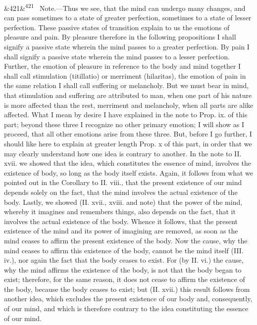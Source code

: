 \documentclass[12pt]{article}
\newcommand{\para}[1][]{\par\noindent\ifx&#1&\else\textsuperscript{\footnotesize #1}~\fi}
\begin{document}
\para[421] Note.---Thus we see, that the mind can undergo many changes, and can pass sometimes to a state of greater perfection, sometimes to a state of lesser perfection. These passive states of transition explain to us the emotions of pleasure and pain. By pleasure therefore in the following propositions I shall signify a passive state wherein the mind passes to a greater perfection. By pain I shall signify a passive state wherein the mind passes to a lesser perfection. Further, the emotion of pleasure in reference to the body and mind together I shall call stimulation (titillatio) or merriment (hilaritas), the emotion of pain in the same relation I shall call suffering or melancholy. But we must bear in mind, that stimulation and suffering are attributed to man, when one part of his nature is more affected than the rest, merriment and melancholy, when all parts are alike affected. What I mean by desire I have explained in the note to Prop. ix. of this part; beyond these three I recognize no other primary emotion; I will show as I proceed, that all other emotions arise from these three. But, before I go further, I should like here to explain at greater length Prop. x of this part, in order that we may clearly understand how one idea is contrary to another. In the note to II. xvii. we showed that the idea, which constitutes the essence of mind, involves the existence of body, so long as the body itself exists. Again, it follows from what we pointed out in the Corollary to II. viii., that the present existence of our mind depends solely on the fact, that the mind involves the actual existence of the body. Lastly, we showed (II. xvii., xviii. and note) that the power of the mind, whereby it imagines and remembers things, also depends on the fact, that it involves the actual existence of the body. Whence it follows, that the present existence of the mind and its power of imagining are removed, as soon as the mind ceases to affirm the present existence of the body. Now the cause, why the mind ceases to affirm this existence of the body, cannot be the mind itself (III. iv.), nor again the fact that the body ceases to exist. For (by II. vi.) the cause, why the mind affirms the existence of the body, is not that the body began to exist; therefore, for the same reason, it does not cease to affirm the existence of the body, because the body ceases to exist; but (II. xvii.) this result follows from another idea, which excludes the present existence of our body and, consequently, of our mind, and which is therefore contrary to the idea constituting the essence of our mind.
\end{document}
